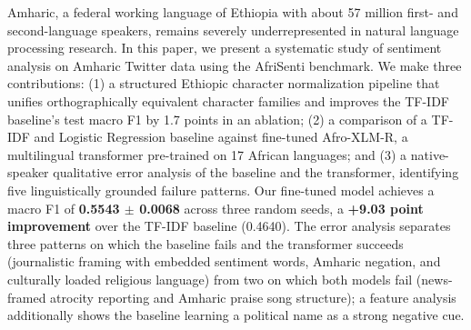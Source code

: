 Amharic, a federal working language of Ethiopia with about 57 million first- and second-language speakers, remains severely underrepresented in natural language processing research. In this paper, we present a systematic study of sentiment analysis on Amharic Twitter data using the AfriSenti benchmark. We make three contributions: (1) a structured Ethiopic character normalization pipeline that unifies orthographically equivalent character families and improves the TF-IDF baseline's test macro F1 by 1.7 points in an ablation; (2) a comparison of a TF-IDF and Logistic Regression baseline against fine-tuned Afro-XLM-R, a multilingual transformer pre-trained on 17 African languages; and (3) a native-speaker qualitative error analysis of the baseline and the transformer, identifying five linguistically grounded failure patterns. Our fine-tuned model achieves a macro F1 of \textbf{0.5543 $\pm$ 0.0068} across three random seeds, a \textbf{+9.03 point improvement} over the TF-IDF baseline (0.4640). The error analysis separates three patterns on which the baseline fails and the transformer succeeds (journalistic framing with embedded sentiment words, Amharic negation, and culturally loaded religious language) from two on which both models fail (news-framed atrocity reporting and Amharic praise song structure); a feature analysis additionally shows the baseline learning a political name as a strong negative cue.
